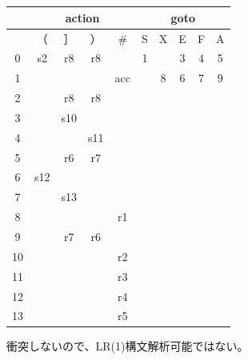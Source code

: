 \documentclass[a4paper,10pt]{jsarticle}
\begin{document}
\section{}
\begin{table}[H]
  \centering
  \begin{tabular}{|c||c|c|c|c|c|c|c|c|c|}
    \hline
       & \multicolumn{4}{c|}{action} & \multicolumn{5}{c|}{goto}                                 \\ \hline
       & （                          & ］                        & ）  & \#  & S & X & E & F & A \\ \hline\hline
    0  & s2                          & r8                        & r8  &     & 1 &   & 3 & 4 & 5 \\ \hline
    1  &                             &                           &     & acc &   & 8 & 6 & 7 & 9 \\ \hline
    2  &                             & r8                        & r8  &     &   &   &   &   &   \\ \hline
    3  &                             & s10                       &     &     &   &   &   &   &   \\ \hline
    4  &                             &                           & s11 &     &   &   &   &   &   \\ \hline
    5  &                             & r6                        & r7  &     &   &   &   &   &   \\ \hline
    6  & s12                         &                           &     &     &   &   &   &   &   \\ \hline
    7  &                             & s13                       &     &     &   &   &   &   &   \\ \hline
    8  &                             &                           &     & r1  &   &   &   &   &   \\ \hline
    9  &                             & r7                        & r6  &     &   &   &   &   &   \\ \hline
    10 &                             &                           &     & r2  &   &   &   &   &   \\ \hline
    11 &                             &                           &     & r3  &   &   &   &   &   \\ \hline
    12 &                             &                           &     & r4  &   &   &   &   &   \\ \hline
    13 &                             &                           &     & r5  &   &   &   &   &   \\ \hline
  \end{tabular}
\end{table}

衝突しないので、LR(1)構文解析可能ではない。
\end{document}
